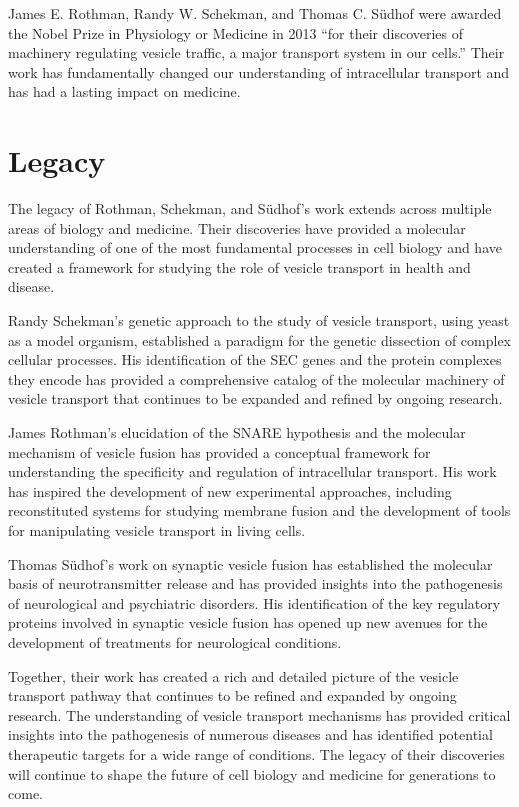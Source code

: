 James E. Rothman, Randy W. Schekman, and Thomas C. S\"udhof were awarded the Nobel Prize in Physiology or Medicine in 2013 ``for their discoveries of machinery regulating vesicle traffic, a major transport system in our cells.'' Their work has fundamentally changed our understanding of intracellular transport and has had a lasting impact on medicine.

\section{Legacy}

The legacy of Rothman, Schekman, and S\"udhof's work extends across multiple areas of biology and medicine. Their discoveries have provided a molecular understanding of one of the most fundamental processes in cell biology and have created a framework for studying the role of vesicle transport in health and disease.

Randy Schekman's genetic approach to the study of vesicle transport, using yeast as a model organism, established a paradigm for the genetic dissection of complex cellular processes. His identification of the SEC genes and the protein complexes they encode has provided a comprehensive catalog of the molecular machinery of vesicle transport that continues to be expanded and refined by ongoing research.

James Rothman's elucidation of the SNARE hypothesis and the molecular mechanism of vesicle fusion has provided a conceptual framework for understanding the specificity and regulation of intracellular transport. His work has inspired the development of new experimental approaches, including reconstituted systems for studying membrane fusion and the development of tools for manipulating vesicle transport in living cells.

Thomas S\"udhof's work on synaptic vesicle fusion has established the molecular basis of neurotransmitter release and has provided insights into the pathogenesis of neurological and psychiatric disorders. His identification of the key regulatory proteins involved in synaptic vesicle fusion has opened up new avenues for the development of treatments for neurological conditions.

Together, their work has created a rich and detailed picture of the vesicle transport pathway that continues to be refined and expanded by ongoing research. The understanding of vesicle transport mechanisms has provided critical insights into the pathogenesis of numerous diseases and has identified potential therapeutic targets for a wide range of conditions. The legacy of their discoveries will continue to shape the future of cell biology and medicine for generations to come.


